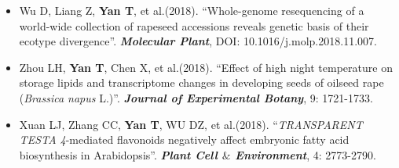 %
%



\begin{itemize}
	\item Wu D, Liang Z, \textbf{Yan T}, et al.(2018). ``Whole-genome resequencing of a world-wide collection of rapeseed accessions reveals genetic basis of their ecotype divergence''. \textbf{\emph{Molecular Plant}}, DOI: 10.1016/j.molp.2018.11.007.
	
	\item Zhou LH, \textbf{Yan T}, Chen X, et al.(2018). ``Effect of high night temperature on storage lipids and transcriptome changes in developing seeds of oilseed rape (\emph{Brassica napus} L.)''. \textbf{\emph{Journal of Experimental Botany}}, 9: 1721-1733.
	
	\item Xuan LJ, Zhang CC, \textbf{Yan T}, WU DZ, et al.(2018). ``\emph{TRANSPARENT TESTA 4}-mediated flavonoids negatively affect embryonic fatty acid biosynthesis in Arabidopsis''. \textbf{\emph{Plant Cell $\&$ Environment}}, 4: 2773-2790.
	
\end{itemize}